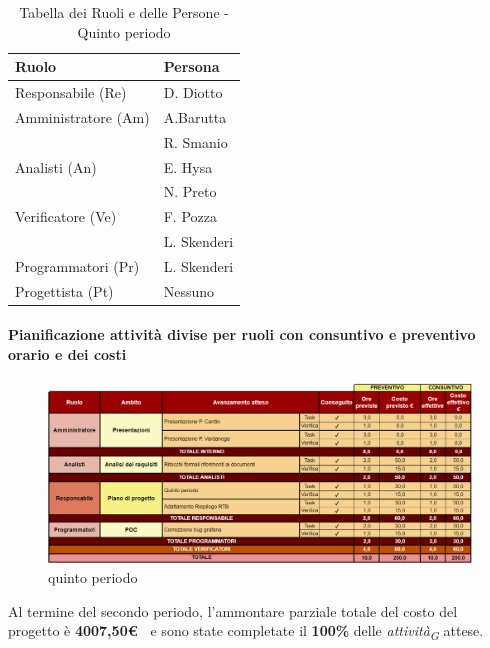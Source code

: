 \begin{table}[H]
    \centering
    \begin{tabular}{|L{4cm}|L{2cm}|}
    \hline
    \textbf{Ruolo} & \textbf{Persona} \\
    \hline
    \hline
    Responsabile (Re)   & D. Diotto \\
    \hline
    Amministratore (Am) & A.Barutta  \\
                        & R. Smanio \\
    \hline
    Analisti (An)       & E. Hysa \\
                        & N. Preto \\
    \hline
    Verificatore (Ve)   & F. Pozza \\
                        & L. Skenderi\\
     \hline
    Programmatori (Pr)  & L. Skenderi \\    
    \hline
    Progettista (Pt)    & Nessuno \\
    \hline
    \end{tabular}
    \caption{Tabella dei Ruoli e delle Persone - Quinto periodo}
    \label{tab:Ruoli_persone_5}
    \end{table}

\newpage
\paragraph{Pianificazione attività divise per ruoli con consuntivo e preventivo orario e dei costi}\hspace{1pt}

\begin{figure}[H]
    \centering
    \includegraphics[width=\linewidth, height=0.9\textheight, keepaspectratio]{../Images/periodo5.PNG}
    \caption{quinto periodo}
    \label{fig:Quinto_periodo}
\end{figure}

Al termine del secondo periodo, l'ammontare parziale totale del costo del progetto è \textbf{ 4007,50\euro\ } e sono state completate il \textbf{100\%} delle \textit{attività}\textsubscript{\textit{G}} attese.

